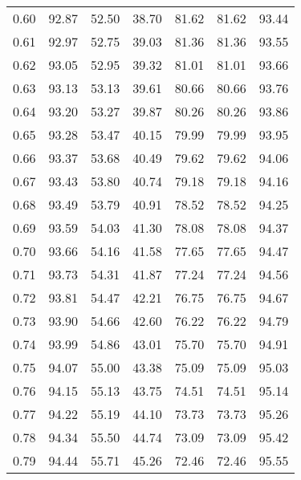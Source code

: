 \begin{tabular}{|c|c|c|c|c|c|c|}
      0.60 &     92.87 &     52.50 &      38.70 &   81.62 &      81.62 &         93.44 \\
      0.61 &     92.97 &     52.75 &      39.03 &   81.36 &      81.36 &         93.55 \\
      0.62 &     93.05 &     52.95 &      39.32 &   81.01 &      81.01 &         93.66 \\
      0.63 &     93.13 &     53.13 &      39.61 &   80.66 &      80.66 &         93.76 \\
      0.64 &     93.20 &     53.27 &      39.87 &   80.26 &      80.26 &         93.86 \\
      0.65 &     93.28 &     53.47 &      40.15 &   79.99 &      79.99 &         93.95 \\
      0.66 &     93.37 &     53.68 &      40.49 &   79.62 &      79.62 &         94.06 \\
      0.67 &     93.43 &     53.80 &      40.74 &   79.18 &      79.18 &         94.16 \\
      0.68 &     93.49 &     53.79 &      40.91 &   78.52 &      78.52 &         94.25 \\
      0.69 &     93.59 &     54.03 &      41.30 &   78.08 &      78.08 &         94.37 \\
      0.70 &     93.66 &     54.16 &      41.58 &   77.65 &      77.65 &         94.47 \\
      0.71 &     93.73 &     54.31 &      41.87 &   77.24 &      77.24 &         94.56 \\
      0.72 &     93.81 &     54.47 &      42.21 &   76.75 &      76.75 &         94.67 \\
      0.73 &     93.90 &     54.66 &      42.60 &   76.22 &      76.22 &         94.79 \\
      0.74 &     93.99 &     54.86 &      43.01 &   75.70 &      75.70 &         94.91 \\
      0.75 &     94.07 &     55.00 &      43.38 &   75.09 &      75.09 &         95.03 \\
      0.76 &     94.15 &     55.13 &      43.75 &   74.51 &      74.51 &         95.14 \\
      0.77 &     94.22 &     55.19 &      44.10 &   73.73 &      73.73 &         95.26 \\
      0.78 &     94.34 &     55.50 &      44.74 &   73.09 &      73.09 &         95.42 \\
      0.79 &     94.44 &     55.71 &      45.26 &   72.46 &      72.46 &         95.55 \\

\end{tabular}
